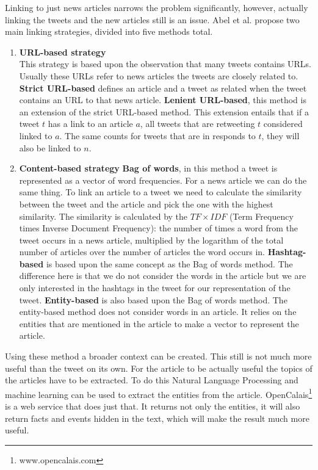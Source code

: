 \documentclass{article}
\begin{document}
Linking to just news articles narrows the problem significantly, however, actually linking the tweets and the new articles still is an issue. Abel et al. propose two main linking strategies, divided into five methods total.
\begin{enumerate}
\item \textbf{URL-based strategy}\\
This strategy is based upon the observation that many tweets contains URLs. Usually these URLs refer to news articles the tweets are closely related to.
	\subitem \textbf{Strict URL-based} defines an article and a tweet as related when the tweet contains an URL to that news article.
	\subitem \textbf{Lenient URL-based}, this method is an extension of the strict URL-based method. This extension entails that if a tweet $t$ has a link to an article $a$, all tweets that are retweeting $t$ considered linked to $a$. The same counts for tweets that are in responds to $t$, they will also be linked to $n$.
\item \textbf{Content-based strategy}
	\subitem \textbf{Bag of words}, in this method a tweet is represented as a vector of word frequencies. For a news article we can do the same thing. To link an article to a tweet we need to calculate the similarity between the tweet and the article and pick the one with the highest similarity. The similarity is calculated by the $TF \times IDF$ (Term Frequency times Inverse Document Frequency): the number of times a word from the tweet occurs in a news article, multiplied by the logarithm of the total number of articles over the number of articles the word occurs in. 
	\subitem \textbf{Hashtag-based} is based upon the same concept as the Bag of words method. The difference here is that we do not consider the words in the article but we are only interested in the hashtags in the tweet for our representation of the tweet.
	\subitem \textbf{Entity-based} is also based upon the Bag of words method. The entity-based method does not consider words in an article. It relies on the entities that are mentioned in the article to make a vector to represent the article. 
\end{enumerate}
Using these method a broader context can be created. This still is not much more useful than the tweet on its own. For the article to be actually useful the topics of the articles have to be extracted. To do this Natural Language Processing and machine learning can be used to extract the entities from the article. OpenCalais\footnote{www.opencalais.com} is a web service that does just that. It returns not only the entities, it will also return facts and events hidden in the text, which will make the result much more useful.
\end{document}
